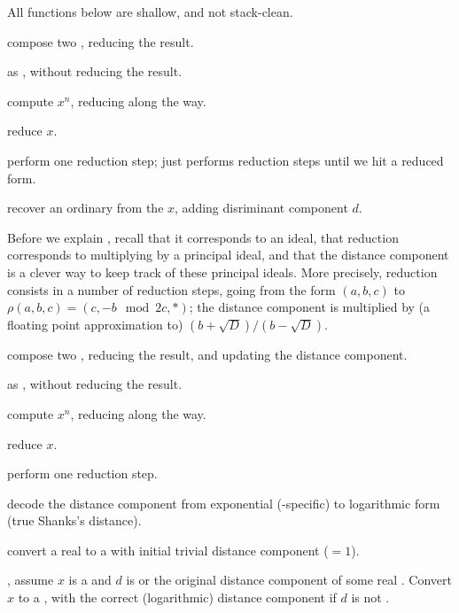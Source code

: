\noindent All functions below are shallow, and not stack-clean.

 compose two
, reducing the result.

as , without reducing the result.

 compute $x^n$, reducing
along the way.

 reduce $x$.

 perform one reduction step;
 just performs reduction steps until we hit a reduced form.

 recover an ordinary  from the
 $x$, adding disriminant component $d$.

Before we explain , recall that it corresponds to an ideal, that
reduction corresponds to multiplying by a principal ideal, and that the
distance component is a clever way to keep track of these principal ideals.
More precisely, reduction consists in a number of reduction steps,
going from the form $(a,b,c)$ to $\rho(a,b,c) = (c, -b \mod 2c, *)$;
the distance component is multiplied by (a floating point approximation to)
$(b + \sqrt{D}) / (b - \sqrt{D})$.

 compose two
, reducing the result, and updating the distance component.

as , without reducing the result.

 compute $x^n$, reducing
along the way.

 reduce $x$.

 perform one reduction step.

 decode the distance component
from exponential (-specific) to logarithmic form (true Shanks's
distance).

 convert a real  to a
 with initial trivial distance component ($= 1$).

, assume $x$ is a  and
$d$ is  or the original distance component of some real .
Convert $x$ to a , with the correct (logarithmic) distance component
if $d$ is not .

